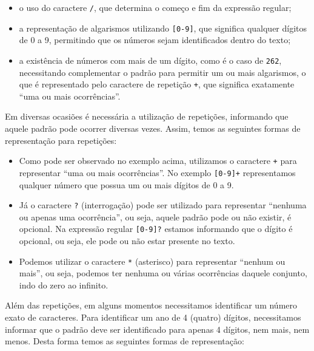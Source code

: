\begin{itemize}

    \item o uso do caractere \texttt{/}, que determina o começo e fim da expressão regular;
    
    \item a representação de algarismos utilizando \texttt{[0-9]}, que significa qualquer dígitos de 0 a 9, permitindo que os números sejam identificados dentro do texto; 
    
    \item a existência de números com mais de um dígito, como é o caso de \texttt{262}, necessitando complementar o padrão para permitir um ou mais algarismos, o que é representado pelo caractere de repetição \texttt{+}, que significa exatamente ``uma ou mais ocorrências''.

\end{itemize}

Em diversas ocasiões é necessária a utilização de repetições, informando que aquele padrão pode ocorrer diversas vezes. Assim, temos as seguintes formas de representação para repetições:

\begin{itemize}

    \item Como pode ser observado no exemplo acima, utilizamos o caractere \texttt{+} para representar ``uma ou mais ocorrências''. No exemplo \texttt{[0-9]+} representamos qualquer número que possua um ou mais dígitos de 0 a 9.
    
    \item Já o caractere \texttt{?} (interrogação) pode ser utilizado para representar ``nenhuma ou apenas uma ocorrência'', ou seja, aquele padrão pode ou não existir, é opcional. Na expressão regular \texttt{[0-9]?} estamos informando que o dígito é opcional, ou seja, ele pode ou não estar presente no texto.
    
    \item Podemos utilizar o caractere \texttt{*} (asterisco) para representar ``nenhum ou mais'', ou seja, podemos ter nenhuma ou várias ocorrências daquele conjunto, indo do zero ao infinito.

\end{itemize}

Além das repetições, em alguns momentos necessitamos identificar um número exato de caracteres. Para identificar um ano de 4 (quatro) dígitos, necessitamos informar que o padrão deve ser identificado para apenas 4 dígitos, nem mais, nem menos. Desta forma temos as seguintes formas de representação:

